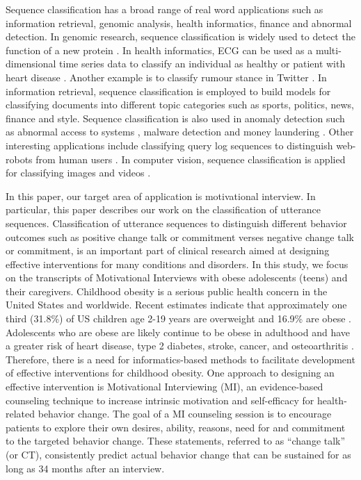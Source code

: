 \documentclass{amia}
\begin{document}
Sequence classification has a broad range of real word applications such as information retrieval, genomic analysis, health informatics, finance and abnormal detection. In genomic research, sequence classification is widely used to detect the function of a new protein \cite{deshpande2002evaluation}. In health informatics, ECG can be used as a multi-dimensional time series data to classify an individual as healthy or patient with heart disease \cite{wei2006semi}. Another example is to classify rumour stance in Twitter \cite{lukasik2016hawkes}. In information retrieval, sequence classification is employed to build  models for classifying documents into different topic categories \cite{sebastiani2002machine} such as sports, politics, news, finance and style. Sequence classification is also used in anomaly detection such as abnormal access to systems \cite{lane1999temporal}, malware detection \cite{drew2017polymorphic} and money laundering \cite{liu2008sequence}. Other interesting applications include classifying query log sequences to distinguish web-robots from human users \cite{duskin2009distinguishing, tan2004discovery}. In computer vision, sequence classification is applied for classifying images \cite{li2000image} and videos \cite{zhang2016tensor}.    

In this paper, our target area of application is motivational interview. In particular, this paper describes our work on the classification of utterance sequences. Classification of utterance sequences to distinguish different behavior outcomes such as positive change talk or commitment verses negative change talk or commitment, is an important part of clinical research aimed at designing effective interventions for many conditions and disorders. In this study, we focus on the transcripts of Motivational Interviews with obese adolescents (teens) and their caregivers. Childhood obesity is a serious public health concern in the United States and worldwide. Recent estimates indicate that approximately one third (31.8\%) of US children age 2-19 years are overweight and 16.9\% are obese \cite{ogden2012prevalence}. Adolescents who are obese are likely continue to be obese in adulthood and have a greater risk of heart disease, type 2 diabetes, stroke, cancer, and osteoarthritis \cite{general2010surgeon}. Therefore, there is a need for informatics-based methods to facilitate development of effective interventions for childhood obesity. One approach to designing an effective intervention is Motivational Interviewing (MI), an evidence-based counseling technique to increase intrinsic motivation and self-efficacy for health-related behavior change. The goal of a MI counseling session is to encourage patients to explore their own desires, ability, reasons, need for and commitment to the targeted behavior change. These statements, referred to as ``change talk'' (or CT), consistently predict actual behavior change that can be sustained for as long as 34 months after an interview. 
\end{document}
